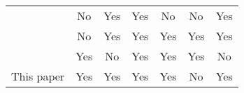 \begin{table}[]
\begin{tabular}{l|c|c|c|c|c|c}
    \cite{shahandashti2012private} & No                                                                   & Yes                                                                    & Yes                                                       & No                                                                             & No                                                                  & Yes                                                                   \\ \cline{1-1}
    \cite{higo2015privacy}         & No                                                                   & Yes                                                                    & Yes                                                       & Yes                                                                             & Yes                                                                 & Yes                                                                   \\ \cline{1-1}
    \cite{vsedvenka2015secure}         & Yes                                                                   & No                                                                    & Yes                                                       & Yes                                                                             & Yes                                                                 & No                                                                   \\ \cline{1-1}
    This paper                       & Yes                                                                  & Yes                                                                    & Yes                                                       & Yes                                                                             & No                                                                  & Yes                                                                   \\ \hline
	\end{tabular}
\end{table}

